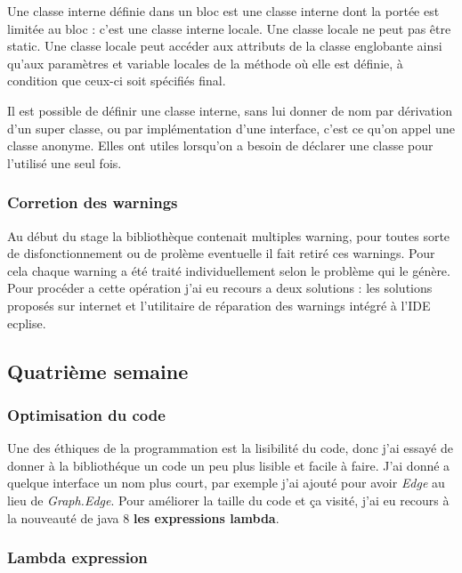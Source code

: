 \documentclass[12pt]{report}
\begin{document}
Une classe interne définie dans un bloc est une classe interne dont la portée est limitée au bloc : c’est une classe interne locale. Une classe locale ne peut pas être static. Une classe locale peut accéder aux attributs de la classe englobante ainsi qu'aux paramètres et variable locales de la méthode où elle est définie, à condition que ceux-ci soit spécifiés final.\newline 

Il est possible de définir une classe interne, sans lui donner de nom par dérivation d’un super classe, ou par implémentation d’une interface, c'est ce qu'on appel une classe anonyme. Elles ont utiles lorsqu'on a besoin de déclarer une classe pour l'utilisé une seul fois.


\subsubsection{Corretion des warnings}

Au début du stage la bibliothèque contenait multiples warning, pour toutes sorte de disfonctionnement ou de prolème eventuelle il fait retiré ces warnings. Pour cela chaque warning a été traité individuellement selon le problème qui le génère. Pour procéder a cette opération j'ai eu recours a deux solutions : les solutions proposés sur internet et l'utilitaire de réparation des warnings intégré à l'IDE ecplise.
~\\

\subsection{Quatrième semaine}

\subsubsection{Optimisation du code}

Une des éthiques de la programmation est la lisibilité du code, donc j'ai essayé de donner à la bibliothéque un code un peu plus lisible et facile à faire. \newline
J'ai donné a quelque interface un nom plus court, par exemple j'ai ajouté  pour avoir \textit{Edge} au lieu de \textit{Graph.Edge}.\newline
Pour améliorer la taille du code et ça visité, j'ai eu recours à la nouveauté de java 8 \textbf{les expressions lambda}.

\subsubsection{Lambda expression}
\end{document}
